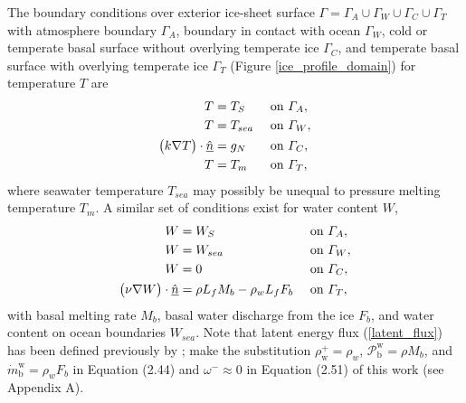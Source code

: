 The boundary conditions over exterior ice-sheet surface $\Gamma = \Gamma_A \cup \Gamma_W \cup \Gamma_C \cup \Gamma_T$ with atmosphere boundary $\Gamma_A$, boundary in contact with ocean $\Gamma_W$, cold or temperate basal surface without overlying temperate ice $\Gamma_C$, and temperate basal surface with overlying temperate ice $\Gamma_T$ (Figure \ref{ice_profile_domain}) for temperature $T$ are
\begin{align}
  \label{surface_temperature}
  T &= T_S &&\text{ on } \varGamma_A, \\
  \label{sea_temperature}
  T &= T_{sea} &&\text{ on } \varGamma_W, \\
  \label{temperature_flux}
  \big( k \nabla T \big) \cdot \underline{\hat{n}} &= g_N &&\text{ on } \varGamma_C, \\
  \label{temperate_temperature}
  T &= T_m &&\text{ on } \varGamma_T,
\end{align}
where seawater temperature $T_{sea}$ may possibly be unequal to pressure melting temperature $T_m$.  A similar set of conditions exist for water content $W$,
\begin{align}
  \label{surface_water}
  W &= W_S      &&\text{ on } \varGamma_A, \\
  \label{sea_water_content}
  W &= W_{sea}  &&\text{ on } \varGamma_W, \\
  \label{cold_water}
  W &= 0        &&\text{ on } \varGamma_C, \\
  \label{latent_flux}
  \big( \nu \nabla W \big) \cdot \underline{\hat{n}} &= \rho L_f M_b - \rho_w L_f F_b  &&\text{ on } \varGamma_T,
\end{align}
with basal melting rate $M_b$, basal water discharge  from the ice $F_b$, and water content on ocean boundaries $W_{sea}$.  Note that latent energy flux  (\ref{latent_flux}) has been defined previously by \citet{greve_1997}; make the substitution $\rho_{\text{w}}^+ = \rho_w$, $\mathcal{P}_{\text{b}}^{\text{w}} = \rho M_b$, and $\dot{m}_{\text{b}}^{\text{w}} = \rho_w F_b$ in Equation (2.44) and $\omega^- \approx 0$ in Equation (2.51) of this work (see Appendix A).


